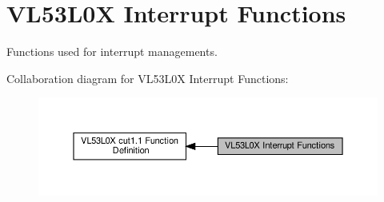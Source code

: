 \hypertarget{group__VL53L0X__interrupt__group}{}\section{V\+L53\+L0X Interrupt Functions}
\label{group__VL53L0X__interrupt__group}


Functions used for interrupt managements.  


Collaboration diagram for V\+L53\+L0X Interrupt Functions\+:\nopagebreak
\begin{figure}[H]
\begin{center}
\leavevmode
\includegraphics[width=350pt]{group__VL53L0X__interrupt__group}
\end{center}
\end{figure}
